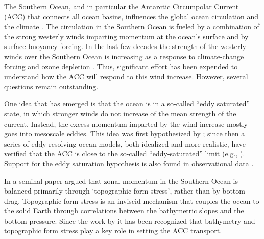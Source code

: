 \documentclass{agujournal2019}
\begin{document}
The Southern Ocean, and in particular the Antarctic Circumpolar Current (ACC) that connects all  ocean basins, influences the global ocean circulation and the climate \cite{Toggweiler-etal-2006, Talley-2013, Ferrari-etal-2014}. The circulation in the Southern Ocean is fueled by a combination of the strong westerly winds imparting momentum at the ocean's surface and by surface buoyancy forcing. In the last few decades the strength of the westerly winds over the Southern Ocean is increasing as a response to climate-change forcing and ozone depletion \cite{Marshall-2003,Swart-Fyfe-2012,Bracegirdle-etal-2013,Farneti-etal-2015}. Thus, significant effort has been expended to understand how the ACC will respond to this wind increase. However, several questions remain outstanding.


One idea that has emerged is that the ocean is in a so-called ``eddy saturated'' state, in which stronger winds do not increase of the mean strength of the current. Instead, the excess momentum imparted by the wind increase mostly goes into mesoscale eddies. This idea was first hypothesized by ; since then a series of eddy-resolving ocean models, both idealized and more realistic, have verified that the ACC is close to the so-called ``eddy-saturated'' limit (e.g., ). Support for the eddy saturation hypothesis is also found in observational data \cite{Boning-etal-2008, Firing-etal-2011, Hogg-etal-2015}.


In a seminal paper  argued that zonal momentum in the Southern Ocean is balanced primarily through `topographic form stress', rather than by bottom drag. Topographic form stress is an inviscid mechanism that couples the ocean to the solid Earth through correlations between the bathymetric slopes and the bottom pressure. Since the work by  it has been recognized that bathymetry and topographic form stress play a key role in setting the ACC transport. 
\end{document}
